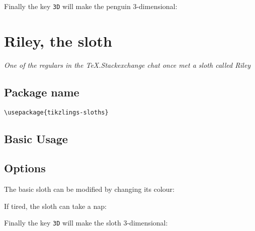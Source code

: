 \documentclass[parskip=half]{scrartcl}
\begin{document}
Finally the key \lstinline|3D| will make the penguin 3-dimensional:
\begin{tcblisting}{}
\penguin[3D]
\end{tcblisting}

%
%
\clearpage
\section[Sloth]{Riley, the sloth}

\emph{One of the regulars in the TeX.Stackexchange chat once met a sloth called Riley}

\subsection{Package name}

\begin{tcolorbox}[lower separated=false, lefthand width=.8\linewidth]
\vspace*{0.5cm}
\lstinline|\usepackage{tikzlings-sloths}| 
\vspace*{0.5cm}
\end{tcolorbox}

\subsection{Basic Usage}

\begin{tcblisting}{}
\sloth
\end{tcblisting}

\subsection{Options}

The basic sloth can be modified by changing its colour:
\begin{tcblisting}{}
\sloth[body=blue]
\end{tcblisting}

If tired, the sloth can take a nap:
\begin{tcblisting}{}
\sloth[sleeping]
\end{tcblisting}

Finally the key \lstinline|3D| will make the sloth 3-dimensional:

\begin{tcblisting}{}
\sloth[3D]
\end{tcblisting}
\end{document}
